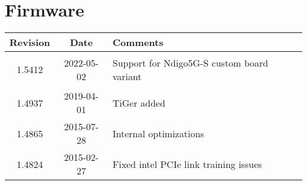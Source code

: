 \section{Firmware}
\begin{tabularx}{\textwidth}{|c|c|X|}
    \hline
    Revision & Date & Comments\\
    \hline\hline
    \hypertarget{fwrev}{1.5412} & 2022-05-02 & Support for Ndigo5G-S custom board variant\\
    \hline
    1.4937 & 2019-04-01 & TiGer added\\
    \hline
    1.4865 & 2015-07-28 & Internal optimizations\\
    \hline
    1.4824 & 2015-02-27 & Fixed intel PCIe link training issues\\
    \hline
\end{tabularx}